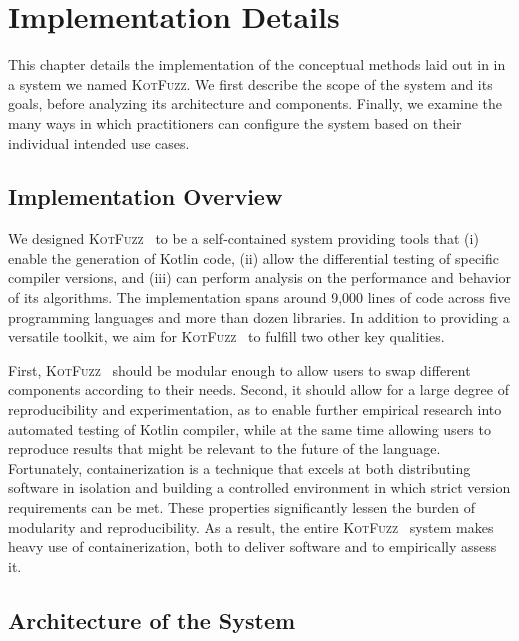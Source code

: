 \chapter{\label{cha:tool} Implementation Details}

\newcommand{\kf}{\textsc{KotFuzz}}

This chapter details the implementation of the conceptual methods
laid out in  in a system
we named \kf.
We first describe the scope of the system and its goals,
before analyzing its architecture and components.
Finally, we examine the many ways in which practitioners
can configure the system based on their individual intended use cases.

\section{\label{sec:overview}Implementation Overview}

We designed \kf~ to be a self-contained system providing tools
that (i) enable the generation of Kotlin code,
(ii) allow the differential testing of specific compiler versions,
and (iii) can perform analysis on the performance
and behavior of its algorithms.
The implementation spans around 9,000 lines of code
across five programming languages and more than dozen libraries.
In addition to providing a versatile toolkit, we aim for
\kf~ to fulfill two other key qualities.

First, \kf~ should be modular enough to allow users
to swap different components according to their needs.
Second, it should allow for a large degree of reproducibility
and experimentation, as to enable further empirical research into 
automated testing of Kotlin compiler, while at the same time
allowing users to reproduce results that might be relevant to the
future of the language.
Fortunately, containerization is a technique that excels
at both distributing software in isolation and building a controlled
environment in which strict version requirements can be met.
These properties significantly lessen the burden of modularity
and reproducibility.
As a result, the entire \kf~ system makes heavy use of containerization,
both to deliver software and to empirically assess it.


\section{\label{sec:architecture}Architecture of the System}

